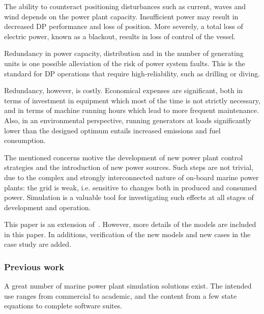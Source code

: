 \documentclass[journal]{IEEEtran}
\begin{document}
The ability to counteract positioning disturbances such as current, waves and wind depends on the power plant capacity. 
Insufficient power may result in decreased DP performance and loss of position. 
More severely, a total loss of electric power, known as a blackout, results in loss of control of the vessel.

Redundancy in power capacity, distribution and in the number of generating units is one possible alleviation of the risk of power system faults.
This is the standard for DP operations that require high-reliability, such as drilling or diving.

Redundancy, however, is costly. Economical expenses are significant, both in terms of investment in equipment which most of the time is not strictly necessary, and in terms of machine running hours which lead to more frequent maintenance. Also, in an environmental perspective, running generators at loads significantly lower than the designed optimum entails increased emissions and fuel consumption.

The mentioned concerns motive the development of new power plant control strategies and the introduction of new power sources. Such steps are not trivial, due to the complex and strongly interconnected nature of on-board marine power plants: the grid is weak, i.e. sensitive to changes both in produced and consumed power. Simulation is a valuable tool for investigating such effects at all stages of development and operation. 

This paper is an extension of~\cite{Bo2015}. However, more details of the models are included in this paper. In additions, verification of the new models and new cases in the case study are added.

\subsubsection{Previous work}
A great number of marine power plant simulation solutions exist. The intended use ranges from commercial to academic, and the content from a few state equations to complete software suites.
\end{document}
